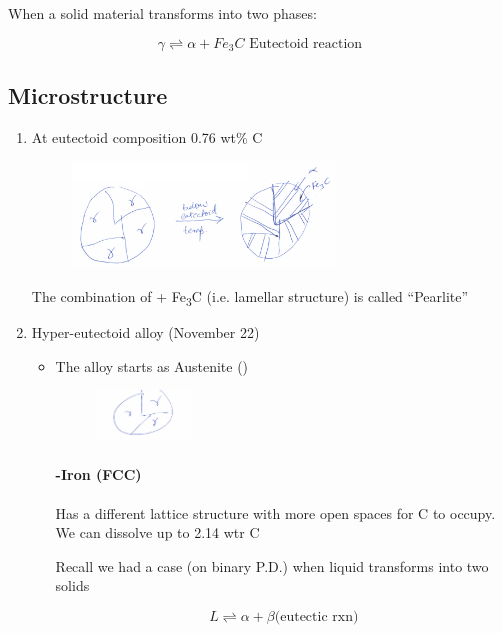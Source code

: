 \documentclass{article}
\begin{document}
When a solid material transforms into two phases:

\[\gamma \rightleftharpoons \alpha + Fe_3C \text{ Eutectoid reaction}\]

\subsection{Microstructure}

\begin{enumerate}
    \item At eutectoid composition 0.76 wt\% C
    \begin{figure}[h!]
	    \centering
	    \includegraphics[width=0.66\textwidth]{assets/7ada0b1a.png}
    \end{figure}
    
    The combination of \textalpha + Fe\textsubscript{3}C (i.e. lamellar structure) is called ``Pearlite''
    \item Hyper-eutectoid alloy (November 22)
    
    \begin{itemize}
        \item The alloy starts as Austenite (\textgamma)
        \begin{figure}[h!]
	        \centering
	        \includegraphics[width=0.26\textwidth]{assets/63f8c9b2.png}
        \end{figure}
        
        \paragraph{\textgamma-Iron (FCC)} Has a different lattice structure with more open spaces for C to occupy. We can dissolve up to 2.14 wtr C
        
        Recall we had a case (on binary P.D.) when liquid transforms into two solids
        
        \[L\rightleftharpoons \alpha + \beta \text{(eutectic rxn)}\]
        

\end{itemize}
\end{enumerate}
\end{document}

